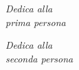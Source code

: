 \thispagestyle{empty}
\begin{flushright}


\textit{Dedica alla\\prima persona}

\vspace{10mm}

\textit{Dedica alla\\seconda persona}


\end{flushright}
\restoregeometry

\leavevmode\thispagestyle{empty}\newpage